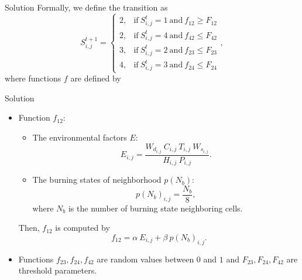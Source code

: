 \documentclass{beamer}
\begin{document}
      \begin{frame}{Solution}
        Formally, we define the transition as
        \begin{equation}
          S_{i,j}^{t+1} =
          \begin{cases}
            2, & \text{if} ~ S_{i,j}^{t} = 1 ~ \text{and} ~ f_{12} \geq F_{12} \\
            2, & \text{if} ~ S_{i,j}^{t} = 4 ~ \text{and} ~ f_{42} \leq F_{42} \\
            3, & \text{if} ~ S_{i,j}^{t} = 2 ~ \text{and} ~ f_{23} \leq F_{23} \\
            4, & \text{if} ~ S_{i,j}^{t} = 3 ~ \text{and} ~ f_{24} \leq F_{24}
          \end{cases},
          \label{eq:transition_rule}
        \end{equation}
        where functions $f$ are defined by
      \end{frame}
      
      \begin{frame}{Solution}
        \begin{itemize}
          \item Function $f_{12}$:
            \begin{itemize}
              \item The environmental factors $E$:
                \begin{equation}
                  E_{i,j} = \frac{W_{d_{i,j}} ~ C_{i,j} ~ T_{i,j} ~ W_{s_{i,j}}}{H_{i,j} ~ P_{i,j}}.
                \end{equation}
              \item The burning states of neighborhood $p(N_b)$:
                \begin{equation}
                  p(N_b)_{i,j} = \frac{N_b}{8},
                \end{equation}
                where $N_b$ is the number of burning state neighboring cells.
            \end{itemize}
            Then, $f_{12}$ is computed by
            \begin{equation}
              f_{12} = \alpha ~ E_{i,j} + \beta ~ p(N_b)_{i,j}.
            \end{equation}
          \item Functions $f_{23}, f_{24}, f_{42}$ are random values between $0$ and $1$ 
            and $F_{23}, F_{24}, F_{42}$ are threshold parameters.
        \end{itemize}
      \end{frame}            
          
\end{document}

